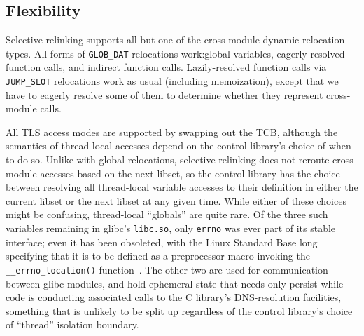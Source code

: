 \subsection{Flexibility}

Selective relinking supports all but one of the cross-module dynamic relocation
types.  All forms of \texttt{GLOB\_DAT} relocations work:\@ global variables,
eagerly-resolved function calls, and indirect function calls.  Lazily-resolved
function calls via \texttt{JUMP\_SLOT} relocations work as usual (including
memoization), except that we have to eagerly resolve some of them to determine
whether they represent cross-module calls.

All TLS access modes are supported by swapping out the TCB, although the semantics of
thread-local accesses depend on the control library's choice of when to do so.
Unlike with global relocations, selective relinking does not reroute cross-module
accesses based on the next libset, so the control library has the choice between
resolving all thread-local variable accesses to their definition in either the
current libset or the next libset at any given time.  While either of these choices
might be confusing, thread-local ``globals'' are quite rare.  Of the three such
variables remaining in glibc's \texttt{libc.so}, only \texttt{errno} was ever part of
its stable interface; even it has been obsoleted, with the Linux Standard Base long
specifying that it is to be defined as a preprocessor macro invoking the
\texttt{\_\_errno\_location()} function~\cite{www-lsb-errno}.  The other two are used
for communication between glibc modules, and hold ephemeral state that needs only
persist while code is conducting associated calls to the C library's DNS-resolution
facilities, something that is unlikely to be split up regardless of the control
library's choice of ``thread'' isolation boundary.

